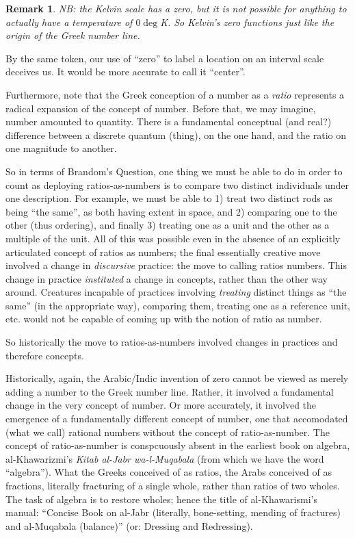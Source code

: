 \documentclass[11pt,twoside]{article}
\newtheorem{remark}{Remark}
\begin{document}
\begin{remark}
  NB: the Kelvin scale has a zero, but it is not possible for anything
  to actually have a temperature of $0\deg$K.  So Kelvin's zero
  functions just like the origin of the Greek number line.
\end{remark}

By the same token, our use of ``zero'' to label a location on an
interval scale deceives us.  It would be more accurate to call it
``center''.

Furthermore, note that the Greek conception of a number as a
\textit{ratio} represents a radical expansion of the concept of
number.  Before that, we may imagine, number amounted to quantity.
There is a fundamental conceptual (and real?) difference between a
discrete quantum (thing), on the one hand, and the ratio on one
magnitude to another.

So in terms of Brandom's Question, one thing we must be able to do in
order to count as deploying ratios-as-numbers is to compare two
distinct individuals under one description.  For example, we must be
able to 1) treat two distinct rods as being ``the same'', as both
having extent in space, and 2) comparing one to the other (thus
ordering), and finally 3) treating one as a unit and the other as a
multiple of the unit.  All of this was possible even in the absence of
an explicitly articulated concept of ratios as numbers; the final
essentially creative move involved a change in \textit{discursive}
practice: the move to calling ratios numbers.  This change in practice
\textit{instituted} a change in concepts, rather than the other way
around.  Creatures incapable of practices involving \textit{treating}
distinct things as ``the same'' (in the appropriate way), comparing
them, treating one as a reference unit, etc. would not be capable of
coming up with the notion of ratio as number.

So historically the move to ratios-as-numbers involved changes in
practices and therefore concepts.

Historically, again, the Arabic/Indic invention of zero cannot be
viewed as merely adding a number to the Greek number line.  Rather, it
involved a fundamental change in the very concept of number.  Or more
accurately, it involved the emergence of a fundamentally different
concept of number, one that accomodated (what we call) rational
numbers without the concept of ratio-as-number.  The concept of
ratio-as-number is conspcuously absent in the earliest book on
algebra, al-Khawarizmi's \textit{Kitab al-Jabr wa-l-Muqabala} (from
which we have the word ``algebra'').  What the Greeks conceived of as
ratios, the Arabs conceived of as fractions, literally fracturing of a
single whole, rather than ratios of two wholes.  The task of algebra is to
restore wholes; hence the title of al-Khawarismi's manual: ``Concise
Book on al-Jabr (literally, bone-setting, mending of fractures) and
al-Muqabala (balance)'' (or: Dressing and Redressing).
\end{document}
